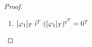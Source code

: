 \begin{proof}
\begin{enumerate}[(1)]

      \item $[\varphi_{1}]_{T} \ \IN^{T} \ ([\varphi_{1}]_{T})^{\mathsf{c}^{T}} = 0^{T}$


\end{enumerate}
\end{proof}
